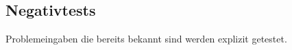 %



\newpage



\subsection*{Negativtests}
\label{Abschnitt:Tests:Protokoll:Negativ}


Problemeingaben die bereits bekannt sind werden explizit getestet.\\







